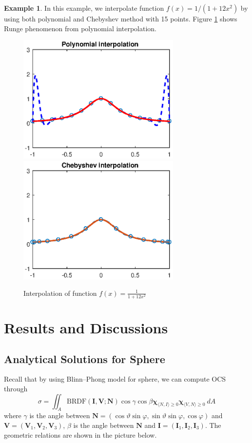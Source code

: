 \documentclass[11pt]{amsart}
\newcommand{\BRDF}{\mathrm{BRDF}}
\newcommand{\ip}[2]{\langle {#1}, {#2} \rangle}
\theoremstyle{definition}
\newtheorem{exmp}{Example}[section]
\begin{document}
\begin{exmp}
In this example, we interpolate function $f(x)=1/(1+12x^2)$ by using both polynomial and Chebyshev method with 15 points. Figure \ref{fig:e2} shows Runge phenomenon from polynomial interpolation.
\begin{figure}[H] 	
        \centerline{\includegraphics[width=3.2in]{./figs/e2a.eps}
      	\hspace{-6pt}
     	\includegraphics[width=3.2in]{./figs/e2b.eps}}
     	\hspace{-6pt}
		\caption{Interpolation of function $f(x)=\frac{1}{1+12x^2}$}
        \label{fig:e2}
\end{figure}
\end{exmp}

\section{Results and Discussions}
\subsection{Analytical Solutions for Sphere}
Recall that by using Blinn--Phong model for sphere, we can compute OCS through
$$\sigma =\iint_{A}\BRDF(\mathbf{I},\mathbf{V};\mathbf{N}) \cos\gamma \cos\beta \mathbf{\chi}_{\ip{N}{I}\geq 0}\mathbf{\chi}_{\ip{V}{N}\geq 0} \: dA$$
where $\gamma$ is the angle between $\mathbf{N}=(\cos\vartheta\sin\varphi,\sin\vartheta\sin\varphi,\cos\varphi)$ and  $\mathbf{V}=(\mathbf{V}_1,\mathbf{V}_2,\mathbf{V}_3)$,  $\beta$ is the angle between $\mathbf{N}$ and $\mathbf{I}=(\mathbf{I}_1,\mathbf{I}_2,\mathbf{I}_3)$. The geometric relations are shown in the picture below.
\end{document}
